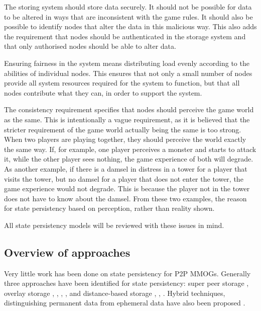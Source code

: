 \documentclass[journal,oneside,a4paper,onecolumn]{IEEEtran}
\begin{document}
The storing system should store data securely. It should not be possible for data to be altered in ways that are inconsistent with the game rules. It should also be possible to identify nodes that alter the data in this malicious way. This also adds the requirement that nodes should be authenticated in the storage system and that only authorised nodes should be able to alter data.

Ensuring fairness in the system means distributing load evenly according to the abilities of individual nodes. This ensures that not only a small number of nodes provide all system resources required for the system to function, but that all nodes contribute what they can, in order to support the system.

The consistency requirement specifies that nodes should perceive the game world as the same. This is intentionally a vague requirement, as it is believed that the stricter requirement of the game world actually being the same is too strong. When two players are playing together, they should perceive the world exactly the same way. If, for example, one player perceives a monster and starts to attack it, while the other player sees nothing, the game experience of both will degrade. As another example, if there is a damsel in distress in a tower for a player that visits the tower, but no damsel for a player that does not enter the tower, the game experience would not degrade. This is because the player not in the tower does not have to know about the damsel. From these two examples, the reason for state persistency based on perception, rather than reality shown.

All state persistency models will be reviewed with these issues in mind.

\subsection{Overview of approaches}
\label{p2p_mmog_cm_overview}

Very little work has been done on state persistency for P2P MMOGs. Generally three approaches have been identified for state persistency: super peer storage \cite{knutsson_p2p_first}, overlay storage \cite{Douglas05enablingmassively}, \cite{using_freenet_storage}, \cite{overlay_storage1}, \cite{Fan_phd}, \cite{past_storage_focus} and distance-based storage \cite{Buyukkaya_voronoi_state_management}, \cite{Hu_voronoi_IM}, \cite{colyseus_distance_based}. Hybrid techniques, distinguishing permanent data from ephemeral data have also been proposed \cite{zoned_federation}.
\end{document}
